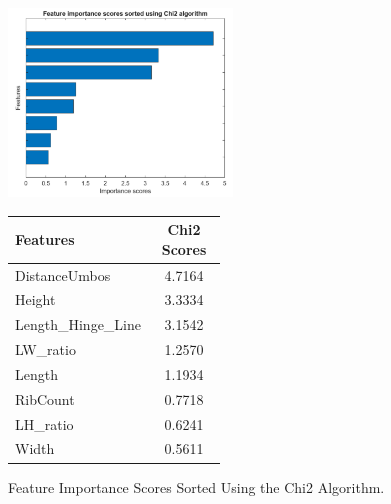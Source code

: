 \begin{figure}[!htbp]
	\centering
	\begin{minipage}{0.48\textwidth} 
		\centering
		\includegraphics[width=\textwidth, height=5cm]{figures/chi2.png} 
	\end{minipage}%
	\hfill 
	\begin{minipage}{0.48\textwidth} 
		\centering
		{\fontsize{12}{15}\selectfont 
			\begin{tabular}{p{0.5\linewidth}c}
				\hline
				\textbf{Features} & \textbf{Chi2 Scores}   \\ \hline
				DistanceUmbos       & 4.7164   \\
				Height              & 3.3334  \\
				Length\_Hinge\_Line & 3.1542  \\
				LW\_ratio           & 1.2570  \\
				Length              & 1.1934  \\
				RibCount            & 0.7718 \\
				LH\_ratio           & 0.6241 \\ 
				Width               & 0.5611 \\ 
				\hline
			\end{tabular}
		}
	\end{minipage}
	\caption{Feature Importance Scores Sorted Using the Chi2 Algorithm.}
	\label{fig:chi2-combined}
\end{figure}


